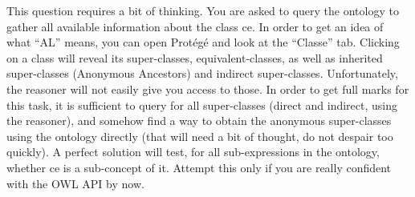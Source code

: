 \documentclass{article}
\begin{document}
    This question requires a bit of thinking. You are asked to query the ontology to gather all available information about the class \textsf{ce}. In order to get an idea of what ``AL'' means, you can open Prot\'eg\'e and look at the ``Classe'' tab. Clicking on a class will reveal its super-classes, equivalent-classes, as well as inherited super-classes (Anonymous Ancestors) and indirect super-classes. Unfortunately, the reasoner will not easily give you access to those. In order to get full marks for this task, it is sufficient to query for all super-classes (direct and indirect, using the reasoner), and somehow find a way to obtain the anonymous super-classes using the ontology directly (that will need a bit of thought, do not despair too quickly). A perfect solution will test, for all sub-expressions in the ontology, whether \textsf{ce} is a sub-concept of it. Attempt this only if you are really confident with the OWL API by now.
\end{document}
